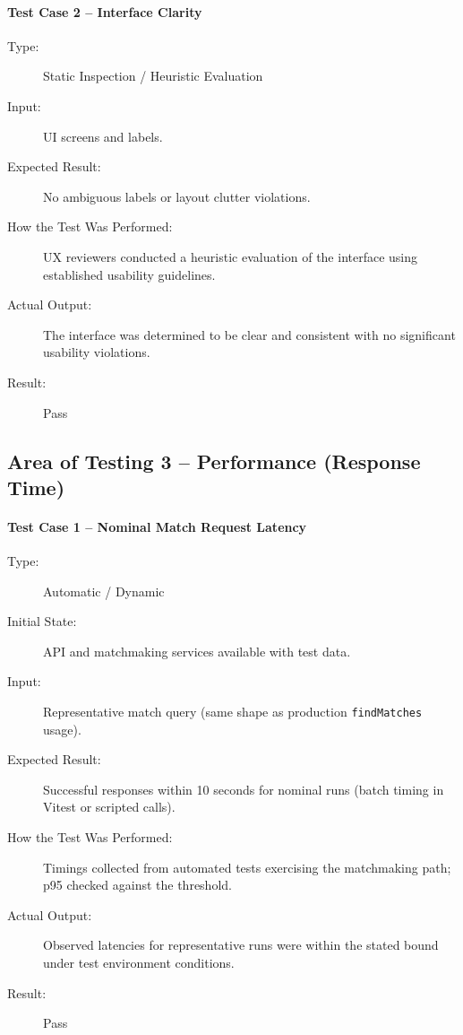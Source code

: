\paragraph{Test Case 2 – Interface Clarity} \label{test-U1-2}
\begin{description}
    \item[Type:] Static Inspection / Heuristic Evaluation
    \item[Input:] UI screens and labels.
    \item[Expected Result:] No ambiguous labels or layout clutter violations.
    \item[How the Test Was Performed:] UX reviewers conducted a heuristic evaluation of the interface using established usability guidelines.
    \item[Actual Output:] The interface was determined to be clear and consistent with no significant usability violations.
    \item[Result:] Pass
\end{description}

\subsection{Area of Testing 3 – Performance (Response Time)}

\paragraph{Test Case 1 – Nominal Match Request Latency} \label{test-P1-1}
\begin{description}
    \item[Type:] Automatic / Dynamic
    \item[Initial State:] API and matchmaking services available with test data.
    \item[Input:] Representative match query (same shape as production \texttt{findMatches} usage).
    \item[Expected Result:] Successful responses within 10 seconds for nominal runs (batch timing in Vitest or scripted calls).
    \item[How the Test Was Performed:] Timings collected from automated tests exercising the matchmaking path; p95 checked against the threshold.
    \item[Actual Output:] Observed latencies for representative runs were within the stated bound under test environment conditions.
    \item[Result:] Pass
\end{description}


